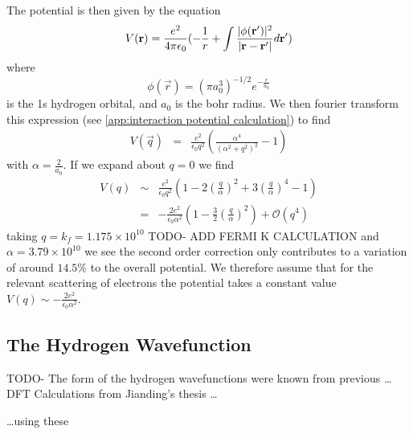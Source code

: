 The potential is then given by the equation
\begin{equation}
  V(\mathbf{r}) = \frac{e^2}{4 \pi \epsilon_0}(
  -\frac{1}{r}
  + \int{\frac{\lvert\phi(\mathbf{r}')\rvert^2}{
      \lvert\mathbf{r} - \mathbf{r'}\rvert} d\mathbf{r}'})
\end{equation}
where
\begin{equation}
  \phi(\vec{r}) = {(\pi a_0^3)}^{-1/2} e^{-\frac{r}{a_0}}
\end{equation}
is the 1s hydrogen orbital, and \(a_0\) is
the bohr radius. We then fourier
transform this expression
(see \cref{app:interaction potential calculation})
to find
\begin{eqnarray}
  V(\vec{q}) &=& \frac{e^2}{\epsilon_0 q^2}(
  \frac{\alpha^4}{{(\alpha^2 + q^2)}^2} - 1
  )
\end{eqnarray}
with \(\alpha = \frac{2}{a_0}\). If we expand
about \(q=0\) we find
\begin{eqnarray}
  V(q) &\sim&\frac{e^2}{\epsilon_0 q^2}(1 - 2{(\frac{q}{\alpha})}^2 + 3 {(\frac{q}{\alpha})}^4 - 1)\\
  {} &=& -\frac{2e^2}{\epsilon_0 \alpha^2}(1 - \frac{3}{2}{(\frac{q}{\alpha})}^2) + \mathcal{O}(q^4)
\end{eqnarray}
taking \(q = k_f = 1.175\times{}10^{10}\) TODO- ADD FERMI K CALCULATION
and \(\alpha = 3.79\times{}10^{10}\) we see the second
order correction only contributes to a variation
of around \(14.5\% \) to the overall potential.
We therefore assume that for the relevant scattering
of electrons the potential takes a constant
value \(V(q) \sim -\frac{2e^2}{\epsilon_0 \alpha^2}\).

\subsection{The Hydrogen Wavefunction}
TODO-
The form of the hydrogen wavefunctions were
known from previous \ldots DFT Calculations from Jianding's thesis \ldots


\ldots using these

